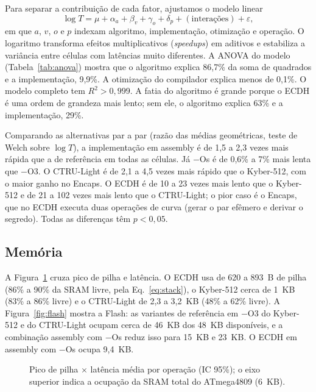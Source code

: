 \documentclass[acmsmall,nonacm,language=english,language=brazilian]{acmart}
\begin{document}
Para separar a contribuição de cada fator, ajustamos o modelo linear
\begin{equation}
  \log T = \mu + \alpha_a + \beta_v + \gamma_o + \delta_p
           + (\text{interações}) + \varepsilon ,
  \label{eq:model}
\end{equation}
em que $a$, $v$, $o$ e $p$ indexam algoritmo, implementação, otimização e
operação. O logaritmo transforma efeitos multiplicativos (\emph{speedups}) em
aditivos e estabiliza a variância entre células com latências muito
diferentes. A ANOVA do modelo (Tabela~\ref{tab:anova}) mostra que o algoritmo
explica 86,7\% da soma de quadrados e a implementação, 9,9\%. A otimização do
compilador explica menos de 0,1\%. O modelo completo tem $R^2 > 0{,}999$. A
fatia do algoritmo é grande porque o ECDH é uma ordem de grandeza mais lento;
sem ele, o algoritmo explica 63\% e a implementação, 29\%.

\begin{table}[t]
  \caption{ANOVA (tipo II) sobre $\log T$: os seis termos de maior $\eta^2$.}
  \label{tab:anova}
  \small
  
\end{table}

Comparando as alternativas par a par (razão das médias geométricas, teste de
Welch sobre $\log T$), a implementação em assembly é de 1,5 a 2,3 vezes mais
rápida que a de referência em todas as células. Já $-$Os é de 0,6\% a 7\% mais
lenta que $-$O3. O CTRU-Light é de 2,1 a 4,5 vezes mais rápido que o
Kyber-512, com o maior ganho no \textsf{Encaps}. O ECDH é de 10 a 23 vezes mais
lento que o Kyber-512 e de 21 a 102 vezes mais lento que o CTRU-Light; o pior
caso é o \textsf{Encaps}, que no ECDH executa duas operações de curva (gerar
o par efêmero e derivar o segredo). Todas as diferenças têm $p < 0{,}05$.

\subsection{Memória}
A Figura~\ref{fig:trade} cruza pico de pilha e latência. O ECDH usa de 620
a 893~B de pilha (86\% a 90\% da SRAM livre, pela Eq.~\ref{eq:stack}), o
Kyber-512 cerca de 1~KB (83\% a 86\% livre) e o CTRU-Light de 2,3 a 3,2~KB
(48\% a 62\% livre). A Figura~\ref{fig:flash} mostra a Flash: as variantes de
referência em $-$O3 do Kyber-512 e do CTRU-Light ocupam cerca de 46~KB dos
48~KB disponíveis, e a combinação assembly com $-$Os reduz isso para 15~KB e
23~KB. O ECDH em assembly com $-$Os ocupa 9,4~KB.

\begin{figure}[t]
  \centering
  
  \caption{Pico de pilha $\times$ latência média por operação (IC 95\%); o eixo
  superior indica a ocupação da SRAM total do ATmega4809 (6~KB).}
  \label{fig:trade}
\end{figure}
\end{document}
